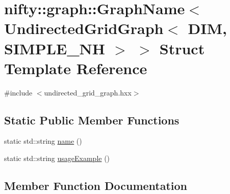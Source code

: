 \hypertarget{structnifty_1_1graph_1_1GraphName_3_01UndirectedGridGraph_3_01DIM_00_01SIMPLE__NH_01_4_01_4}{}\section{nifty\+:\+:graph\+:\+:Graph\+Name$<$ Undirected\+Grid\+Graph$<$ D\+I\+M, S\+I\+M\+P\+L\+E\+\_\+\+N\+H $>$ $>$ Struct Template Reference}
\label{structnifty_1_1graph_1_1GraphName_3_01UndirectedGridGraph_3_01DIM_00_01SIMPLE__NH_01_4_01_4}


{\ttfamily \#include $<$undirected\+\_\+grid\+\_\+graph.\+hxx$>$}

\subsection*{Static Public Member Functions}
\begin{DoxyCompactItemize}
\item 
static std\+::string \hyperlink{structnifty_1_1graph_1_1GraphName_3_01UndirectedGridGraph_3_01DIM_00_01SIMPLE__NH_01_4_01_4_aa0e1bec8e4b38ab328fd2a3ff5a30328}{name} ()
\item 
static std\+::string \hyperlink{structnifty_1_1graph_1_1GraphName_3_01UndirectedGridGraph_3_01DIM_00_01SIMPLE__NH_01_4_01_4_a2a5e5d8519a4690e6b6598e0d09aa281}{usage\+Example} ()
\end{DoxyCompactItemize}


\subsection{Member Function Documentation}
\hypertarget{structnifty_1_1graph_1_1GraphName_3_01UndirectedGridGraph_3_01DIM_00_01SIMPLE__NH_01_4_01_4_aa0e1bec8e4b38ab328fd2a3ff5a30328}{}
